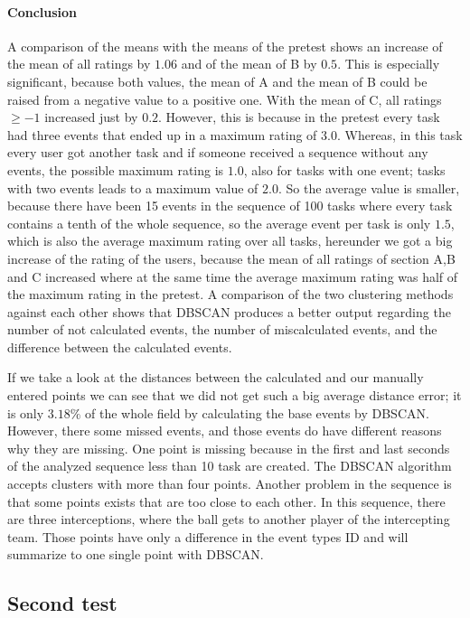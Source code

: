 \paragraph{Conclusion}
A comparison of the means with the means of the pretest shows an increase of the mean of all ratings by $1.06$ and of the mean of B by $0.5$.
This is especially significant, because both values, the mean of A and the mean of B could be raised from a negative value to a positive one.
With the mean of C, all ratings $\ge -1$ increased just by $0.2$. However, this is because in the pretest every task had three events that ended up in a maximum rating of $3.0$. Whereas, in this task every user got another task and if someone received a sequence without any events, the possible maximum rating is $1.0$, also for tasks with one event; tasks with two events leads to a maximum value of $2.0$. So the average value is smaller, because there have been 15 events in the sequence of 100 tasks where every task contains a tenth of the whole sequence, so the average event per task is only $1.5$, which is also the average maximum rating over all tasks, hereunder we got a big increase of the rating of the users, because the mean of all ratings of section A,B and C increased where at the same time the average maximum rating was half of the maximum rating in the pretest.
\newline
A comparison of the two clustering methods against each other shows that DBSCAN produces a better output regarding the number of not calculated events, the number of miscalculated events, and the difference between the calculated events.

If we take a look at the distances between the calculated and our manually entered points we can see that we did not get such a big average distance error; it is only $3.18\%$ of the whole field by calculating the base events by DBSCAN.
However, there some missed events, and those events do have different reasons why they are missing.
One point is missing because in the first and last seconds of the analyzed sequence less than 10 task are created. The DBSCAN algorithm accepts clusters with more than four points.
Another problem in the sequence is that some points exists that are too close to each other. In this sequence, there are three interceptions, where the ball gets to another player of the intercepting team. Those points have only a difference in the event types ID and will summarize to one single point with DBSCAN.

\subsection{Second test}

